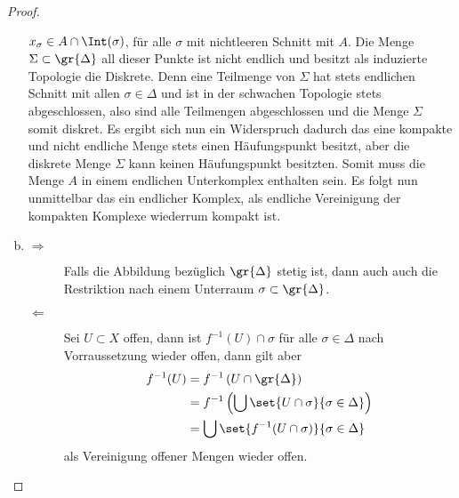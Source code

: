 \begin{Satz}
\begin{proof}
\begin{enumerate}[(a)]
            $x_\sigma \in A \cap \Int(\sigma)$, für alle $\sigma$ mit
            nichtleeren Schnitt mit $A$. Die Menge
            $\Sigma \subset \gr{\Delta}$ all dieser Punkte ist nicht
            endlich und besitzt als induzierte Topologie die
            Diskrete. Denn eine Teilmenge von $\Sigma$ hat stets
            endlichen Schnitt mit allen $\sigma \in \Delta$ und ist in
            der schwachen Topologie stets abgeschlossen, also sind
            alle Teilmengen abgeschlossen und die Menge $\Sigma$ somit
            diskret.
            Es ergibt sich nun ein Widerspruch dadurch das eine
            kompakte und nicht endliche Menge stets einen
            Häufungspunkt besitzt, aber die diskrete Menge $\Sigma$
            kann keinen Häufungspunkt besitzten.
            Somit muss die Menge $A$ in einem endlichen Unterkomplex
            enthalten sein. Es folgt nun unmittelbar das ein endlicher
            Komplex, als endliche Vereinigung der kompakten Komplexe
            wiederrum kompakt ist.
          \item 
            \begin{description}
            \item[\glqq $\Rightarrow$\grqq] Falls die Abbildung
              bezüglich $\gr{\Delta}$ stetig ist, dann auch auch die
              Restriktion nach einem Unterraum
              $\sigma \subset \gr{\Delta}$.
            \item[\glqq $\Leftarrow$ \grqq] Sei $U \subset X$ offen,
              dann ist $f^{-1}(U) \cap \sigma$ für alle
              $\sigma \in \Delta$ nach Vorraussetzung wieder offen,
              dann gilt aber
              \begin{align*}
                f^{-1}(U) &= f^{-1} \left(U \cap \gr{\Delta} \right)\\ &=
                f^{-1} \left(\bigcup \set{ U \cap \sigma }{ \sigma \in
                    \Delta} \right)\\ &= \bigcup \set{ f^{-1}(U \cap
                  \sigma) }{ \sigma \in \Delta}
              \end{align*}
              als Vereinigung offener Mengen wieder offen.
            \end{description}
          \end{enumerate}
	\end{proof}
\end{Satz}

